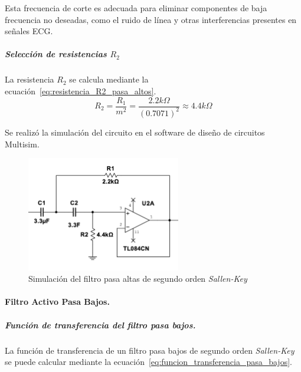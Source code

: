                     Esta frecuencia de corte es adecuada para eliminar componentes de baja frecuencia no deseadas, como el ruido de línea y otras interferencias presentes en señales ECG.

                \subparagraph{Selección de resistencias $R_2$}
                    La resistencia $R_2$ se calcula mediante la ecuación~\ref{eq:resistencia_R2_pasa_altos}.
                    \begin{equation}
                        \label{eq:resistencia_R2_pasa_altos}
                        R_2 = \frac{R_1}{m^2} = \frac{2.2 k\Omega}{(0.7071)^2} \approx 4.4 k\Omega 
                    \end{equation}

                    Se realizó la simulación del circuito en el software de diseño de circuitos Multisim.

                    \begin{figure}[H]
                        \centering
                        \includegraphics[width=0.6\textwidth]{img/Desarrollo/multisim_pasaAltos.png}
                        \caption[Simulación del filtro pasa altas de segundo orden \textit{Sallen-Key}.]{Simulación del filtro pasa altas de segundo orden \textit{Sallen-Key}\footnotemark}
                        \label{fig:Simulacion_Filtro_Pasa_Altas}
                    \end{figure}

            \paragraph{Filtro Activo Pasa Bajos.}
                \subparagraph{Función de transferencia del filtro pasa bajos.}
                    La función de transferencia de un filtro pasa bajos de segundo orden \textit{Sallen-Key} se puede calcular mediante la ecuación~\ref{eq:funcion_transferencia_pasa_bajos}.

